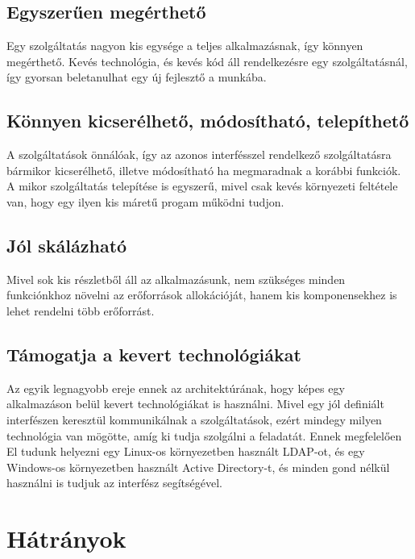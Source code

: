 \documentclass[11pt,magyar,a4paper,oneside,]{report}
\begin{document}
\subsection{Egyszerűen
megérthető}\label{egyszerux171en-meguxe9rthetux151}

Egy szolgáltatás nagyon kis egysége a teljes alkalmazásnak, így könnyen
megérthető. Kevés technológia, és kevés kód áll rendelkezésre egy
szolgáltatásnál, így gyorsan beletanulhat egy új fejlesztő a munkába.

\subsection{Könnyen kicserélhető, módosítható,
telepíthető}\label{kuxf6nnyen-kicseruxe9lhetux151-muxf3dosuxedthatuxf3-telepuxedthetux151}

A szolgáltatások önnálóak, így az azonos interfésszel rendelkező
szolgáltatásra bármikor kicserélhető, illetve módosítható ha megmaradnak
a korábbi funkciók. A mikor szolgáltatás telepítése is egyszerű, mivel
csak kevés környezeti feltétele van, hogy egy ilyen kis máretű progam
működni tudjon.

\subsection{Jól skálázható}\label{juxf3l-skuxe1luxe1zhatuxf3}

Mivel sok kis részletből áll az alkalmazásunk, nem szükséges minden
funkciónkhoz növelni az erőforrások allokációját, hanem kis
komponensekhez is lehet rendelni több erőforrást.

\subsection{Támogatja a kevert
technológiákat}\label{tuxe1mogatja-a-kevert-technoluxf3giuxe1kat}

Az egyik legnagyobb ereje ennek az architektúrának, hogy képes egy
alkalmazáson belül kevert technológiákat is használni. Mivel egy jól
definiált interfészen keresztül kommunikálnak a szolgáltatások, ezért
mindegy milyen technológia van mögötte, amíg ki tudja szolgálni a
feladatát. Ennek megfelelően El tudunk helyezni egy Linux-os
környezetben használt LDAP-ot, és egy Windows-os környezetben használt
Active Directory-t, és minden gond nélkül használni is tudjuk az
interfész segítségével.

\section{Hátrányok
\citep{micro-disadv}}\label{huxe1truxe1nyok-micro-disadv}
\end{document}
